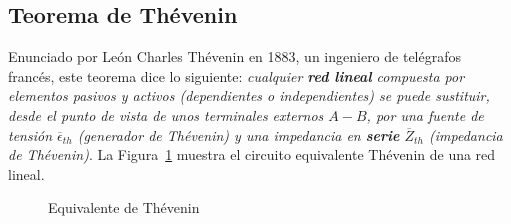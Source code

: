 \subsection{Teorema de Thévenin}
Enunciado por León Charles Thévenin en 1883, un ingeniero de
telégrafos francés, este teorema dice lo siguiente: \textit{cualquier
  \textbf{red lineal} compuesta por elementos pasivos y activos
  (dependientes o independientes) se puede sustituir, desde el punto
  de vista de unos terminales externos $A-B$, por una fuente de
  tensión $\overline{\epsilon}_{th}$ (generador de Thévenin) y una
  impedancia en \textbf{serie} $\overline{Z}_{th}$ (impedancia de
  Thévenin)}. La Figura~\ref{fig:thevenin_ca} muestra el circuito
equivalente Thévenin de una red lineal.
\begin{figure}[H]
  \centering {}\hfil
  \caption{Equivalente de Thévenin}
  \label{fig:thevenin_ca}
\end{figure}
     
